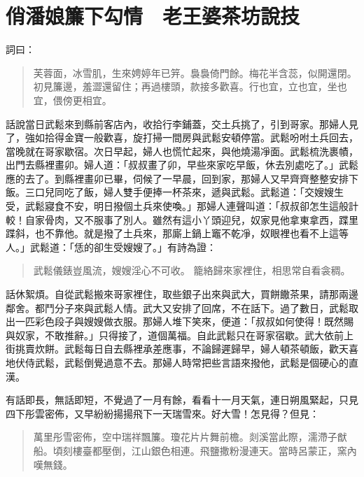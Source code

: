 
\chapter{俏潘娘簾下勾情　老王婆茶坊說技}

詞曰：
\begin{quote}
芙蓉面，冰雪肌，生來娉婷年已笄。裊裊倚門餘。梅花半含蕊，似開還閉。初見簾邊，羞澀還留住；再過樓頭，款接多歡喜。行也宜，立也宜，坐也宜，偎傍更相宜。
\end{quote}

話說當日武鬆來到縣前客店內，收拾行李鋪蓋，交土兵挑了，引到哥家。那婦人見了，強如拾得金寶一般歡喜，旋打掃一間房與武鬆安頓停當。武鬆吩咐土兵回去，當晚就在哥家歇宿。次日早起，婦人也慌忙起來，與他燒湯凈面。武鬆梳洗裹幘，出門去縣裡畫卯。婦人道：「叔叔畫了卯，早些來家吃早飯，休去別處吃了。」武鬆應的去了。到縣裡畫卯已畢，伺候了一早晨，回到家，那婦人又早齊齊整整安排下飯。三口兒同吃了飯，婦人雙手便捧一杯茶來，遞與武鬆。武鬆道：「交嫂嫂生受，武鬆寢食不安，明日撥個土兵來使喚。」那婦人連聲叫道：「叔叔卻怎生這般計較！自家骨肉，又不服事了別人。雖然有這小丫頭迎兒，奴家見他拿東拿西，蹀里蹀斜，也不靠他。就是撥了土兵來，那廝上鍋上竈不乾凈，奴眼裡也看不上這等人。」武鬆道：「恁的卻生受嫂嫂了。」有詩為證：
\begin{quote}
武鬆儀錶豈風流，嫂嫂淫心不可收。
籠絡歸來家裡住，相思常自看衾稠。
\end{quote}

話休絮煩。自從武鬆搬來哥家裡住，取些銀子出來與武大，買餅饊茶果，請那兩邊鄰舍。都鬥分子來與武鬆人情。武大又安排了回席，不在話下。過了數日，武鬆取出一匹彩色段子與嫂嫂做衣服。那婦人堆下笑來，便道：「叔叔如何使得！既然賜與奴家，不敢推辭。」只得接了，道個萬福。自此武鬆只在哥家宿歇。武大依前上街挑賣炊餅。武鬆每日自去縣裡承差應事，不論歸遲歸早，婦人頓茶頓飯，歡天喜地伏侍武鬆，武鬆倒覺過意不去。那婦人時常把些言語來撥他，武鬆是個硬心的直漢。

有話即長，無話即短，不覺過了一月有餘，看看十一月天氣，連日朔風緊起，只見四下彤雲密佈，又早紛紛揚揚飛下一天瑞雪來。好大雪！怎見得？但見：
\begin{quote}
萬里彤雪密佈，空中瑞祥飄簾。瓊花片片舞前檐。剡溪當此際，濡滯子猷船。頃刻樓臺都壓倒，江山銀色相連。飛鹽撒粉漫連天。當時呂蒙正，窯內嘆無錢。
\end{quote}

